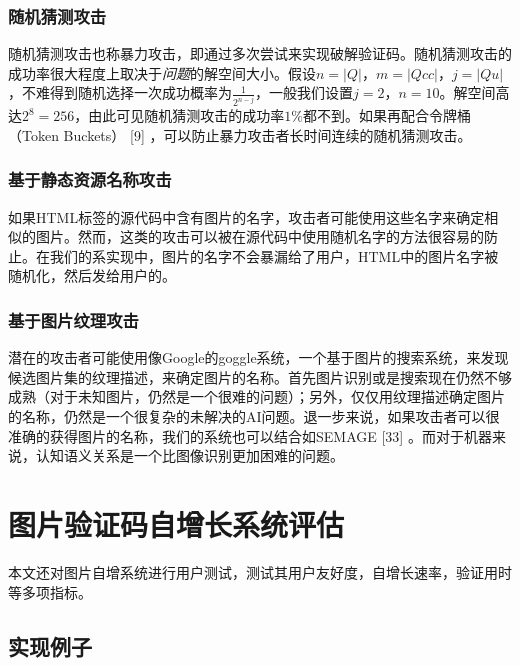 \documentclass[bachelor,zhspacing]{cqu}  %
\begin{document}
\subsubsection{随机猜测攻击}\label{ux968fux673aux731cux6d4bux653bux51fb}

随机猜测攻击也称暴力攻击，即通过多次尝试来实现破解验证码。随机猜测攻击的成功率很大程度上取决于\emph{问题}的解空间大小。假设\(n = \vert Q \vert\)，\(m = \vert Qcc \vert\)，\(j = \vert Qu \vert\)，不难得到随机选择一次成功概率为\(\frac{1}{2^{n-j}}\)，一般我们设置\(j=2\)，\(n=10\)。解空间高达\(2^8=256\)，由此可见随机猜测攻击的成功率\(1\%\)都不到。如果再配合令牌桶（Token
Buckets） {[}9{]} ，可以防止暴力攻击者长时间连续的随机猜测攻击。

\subsubsection{基于静态资源名称攻击}\label{ux57faux4e8eux9759ux6001ux8d44ux6e90ux540dux79f0ux653bux51fb}

如果HTML标签的源代码中含有图片的名字，攻击者可能使用这些名字来确定相似的图片。然而，这类的攻击可以被在源代码中使用随机名字的方法很容易的防止。在我们的系实现中，图片的名字不会暴漏给了用户，HTML中的图片名字被随机化，然后发给用户的。

\subsubsection{基于图片纹理攻击}\label{ux57faux4e8eux56feux7247ux7eb9ux7406ux653bux51fb}

潜在的攻击者可能使用像Google的goggle系统，一个基于图片的搜索系统，来发现候选图片集的纹理描述，来确定图片的名称。首先图片识别或是搜索现在仍然不够成熟（对于未知图片，仍然是一个很难的问题）；另外，仅仅用纹理描述确定图片的名称，仍然是一个很复杂的未解决的AI问题。退一步来说，如果攻击者可以很准确的获得图片的名称，我们的系统也可以结合如SEMAGE
{[}33{]} 。而对于机器来说，认知语义关系是一个比图像识别更加困难的问题。

\section{图片验证码自增长系统评估}\label{ux56feux7247ux9a8cux8bc1ux7801ux81eaux589eux957fux7cfbux7edfux8bc4ux4f30}

本文还对图片自增系统进行用户测试，测试其用户友好度，自增长速率，验证用时等多项指标。

\subsection{实现例子}\label{ux5b9eux73b0ux4f8bux5b50}
\end{document}
